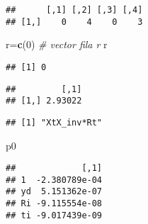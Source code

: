 \documentclass[
]{article}
\newenvironment{Shaded}{\begin{snugshade}}{\end{snugshade}}
\newcommand{\CommentTok}[1]{\textcolor[rgb]{0.56,0.35,0.01}{\textit{#1}}}
\newcommand{\DecValTok}[1]{\textcolor[rgb]{0.00,0.00,0.81}{#1}}
\newcommand{\KeywordTok}[1]{\textcolor[rgb]{0.13,0.29,0.53}{\textbf{#1}}}
\newcommand{\NormalTok}[1]{#1}
\newcommand{\OperatorTok}[1]{\textcolor[rgb]{0.81,0.36,0.00}{\textbf{#1}}}
\newcommand{\StringTok}[1]{\textcolor[rgb]{0.31,0.60,0.02}{#1}}
\begin{document}
\begin{verbatim}
##      [,1] [,2] [,3] [,4]
## [1,]    0    4    0    3
\end{verbatim}

\begin{Shaded}
\begin{Highlighting}[]
\NormalTok{r=}\KeywordTok{c}\NormalTok{(}\DecValTok{0}\NormalTok{)   }\CommentTok{# vector fila r}
\NormalTok{r}
\end{Highlighting}
\end{Shaded}

\begin{verbatim}
## [1] 0
\end{verbatim}

\begin{Shaded}
\end{Shaded}

\begin{verbatim}
##         [,1]
## [1,] 2.93022
\end{verbatim}

\begin{Shaded}
\end{Shaded}

\begin{verbatim}
## [1] "XtX_inv*Rt"
\end{verbatim}

\begin{Shaded}
\begin{Highlighting}[]
\NormalTok{p0}
\end{Highlighting}
\end{Shaded}

\begin{verbatim}
##             [,1]
## 1  -2.380789e-04
## yd  5.151362e-07
## Ri -9.115554e-08
## ti -9.017439e-09
\end{verbatim}

\begin{Shaded}
\end{Shaded}
\end{document}
